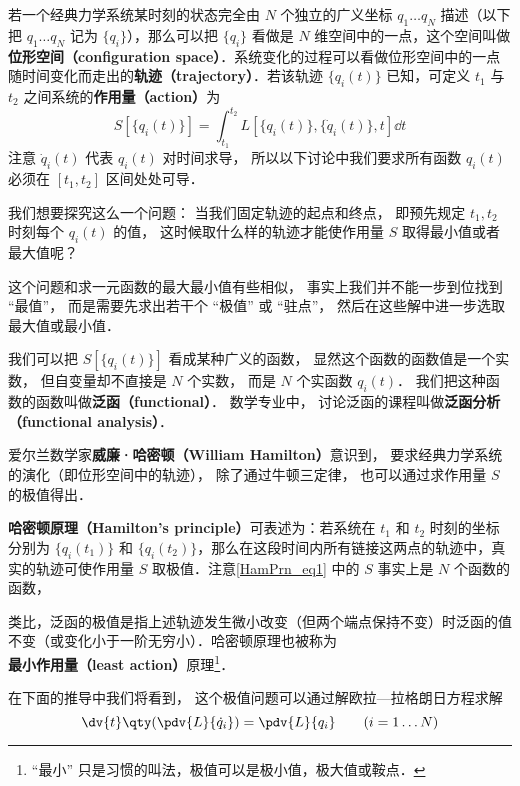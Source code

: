 

若一个经典力学系统某时刻的状态完全由 $N$ 个独立的广义坐标 $q_1\dots q_N$ 描述（以下把 $q_1\dots q_N$ 记为 $\{q_i\}$），那么可以把 $\{q_i\}$ 看做是 $N$ 维空间中的一点，这个空间叫做\textbf{位形空间（configuration space）}．系统变化的过程可以看做位形空间中的一点随时间变化而走出的\textbf{轨迹（trajectory）}．若该轨迹 $\{ {{q_i}(t)} \}$ 已知，可定义 $t_1$ 与 $t_2$ 之间系统的\textbf{作用量（action）}为
\begin{equation}\label{HamPrn_eq1}
S[\{q_i(t)\}] = \int_{t_1}^{t_2} L[\{q_i(t)\}, \{\dot q_i(t)\}, t] \dd{t}
\end{equation}
注意 $\dot q_i(t)$ 代表 $q_i(t)$ 对时间求导， 所以以下讨论中我们要求所有函数 $q_i(t)$ 必须在 $[t_1, t_2]$ 区间处处可导．

我们想要探究这么一个问题： 当我们固定轨迹的起点和终点， 即预先规定 $t_1, t_2$ 时刻每个 $q_i(t)$ 的值， 这时候取什么样的轨迹才能使作用量 $S$ 取得最小值或者最大值呢？

这个问题和求一元函数的最大最小值有些相似， 事实上我们并不能一步到位找到 “最值”， 而是需要先求出若干个 “极值” 或 “驻点”， 然后在这些解中进一步选取最大值或最小值．

我们可以把 $S[\{q_i(t)\}]$ 看成某种广义的函数， 显然这个函数的函数值是一个实数， 但自变量却不直接是 $N$ 个实数， 而是 $N$ 个实函数 $q_i(t)$． 我们把这种函数的函数叫做\textbf{泛函（functional）}．%
数学专业中， 讨论泛函的课程叫做\textbf{泛函分析（functional analysis）}．

爱尔兰数学家\textbf{威廉·哈密顿（William Hamilton）}意识到， 要求经典力学系统的演化（即位形空间中的轨迹）， 除了通过牛顿三定律， 也可以通过求作用量 $S$ 的极值得出．

\textbf{哈密顿原理（Hamilton's principle）}可表述为：若系统在 $t_1$ 和 $t_2$ 时刻的坐标分别为 $\{q_i(t_1)\}$ 和 $\{q_i(t_2)\}$，那么在这段时间内所有链接这两点的轨迹中，真实的轨迹可使作用量 $S$ 取极值．注意\autoref{HamPrn_eq1} 中的 $S$ 事实上是 $N$ 个函数的函数， 

类比，泛函的极值是指上述轨迹发生微小改变（但两个端点保持不变）时泛函的值不变（或变化小于一阶无穷小）．哈密顿原理也被称为\textbf{最小作用量（least action）}原理\footnote{“最小” 只是习惯的叫法，极值可以是极小值，极大值或鞍点．}．%

在下面的推导中我们将看到， 这个极值问题可以通过解欧拉—拉格朗日方程求解
\begin{equation}
\dv{t} \qty(\pdv{L}{\dot q_i}) = \pdv{L}{q_i} \qquad
(i = 1\dots N)
\end{equation}

